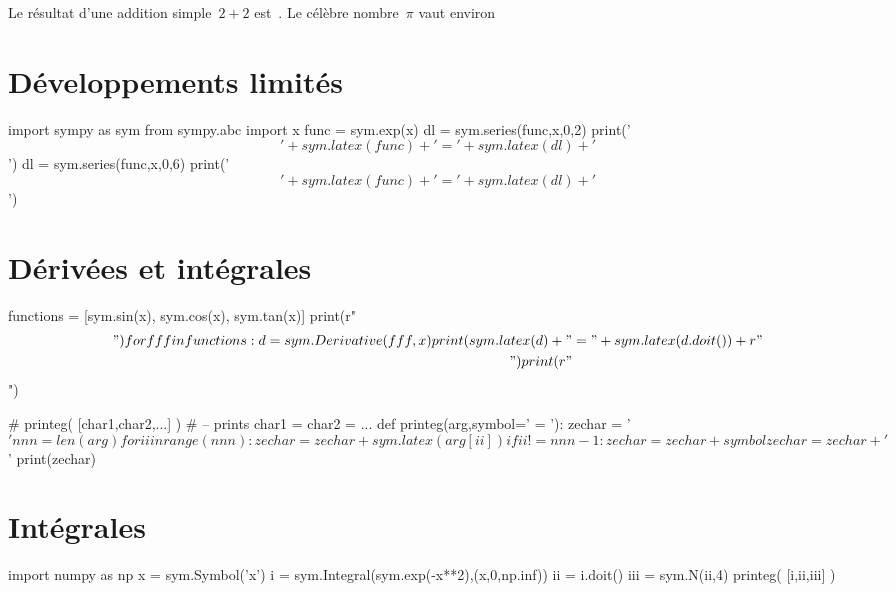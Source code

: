 \documentclass[12pt]{scrartcl}
\begin{document}
Le résultat d'une addition simple~$2+2$ est~. Le célèbre nombre~$\pi$ vaut environ  

\section{Développements limités}

\begin{pyblock}
import sympy as sym
from sympy.abc import x
func = sym.exp(x)
dl = sym.series(func,x,0,2)
print('\['+sym.latex(func)+'='+sym.latex(dl)+'\]')
dl = sym.series(func,x,0,6)
print('\['+sym.latex(func)+'='+sym.latex(dl)+'\]')
\end{pyblock}
\printpythontex

\section{Dérivées et intégrales}

\begin{pycode}
functions = [sym.sin(x), sym.cos(x), sym.tan(x)]
print(r"\begin{align*}")
for fff in functions:
 d = sym.Derivative(fff, x)
 print(sym.latex(d) + "&=" + sym.latex(d.doit()) + r"\\")
print(r"\end{align*}")
\end{pycode}

\begin{pycode}
# printeg( [char1,char2,...] )
# -- prints char1 = char2 = ...
def printeg(arg,symbol=' = '):
  zechar = '\[ '
  nnn = len(arg)
  for ii in range(nnn):
    zechar = zechar + sym.latex(arg[ii])
    if ii != nnn-1:
      zechar = zechar + symbol
  zechar = zechar + ' \]'
  print(zechar)
\end{pycode}

\section{Intégrales}
\begin{pyblock}
import numpy as np
x = sym.Symbol('x')
i = sym.Integral(sym.exp(-x**2),(x,0,np.inf))
ii = i.doit()
iii = sym.N(ii,4)
printeg( [i,ii,iii] )
\end{pyblock}
\printpythontex

\end{document}
